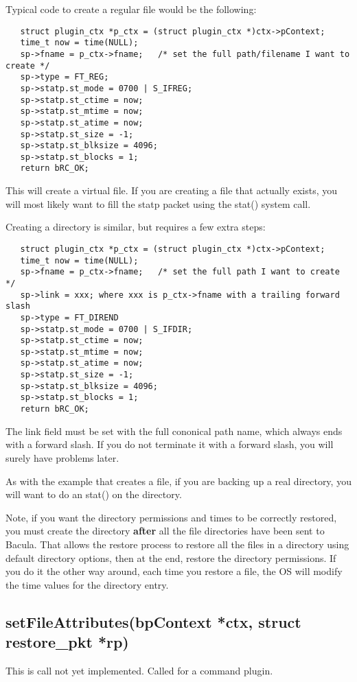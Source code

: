 Typical code to create a regular file would be the following:

\begin{verbatim}
   struct plugin_ctx *p_ctx = (struct plugin_ctx *)ctx->pContext;
   time_t now = time(NULL);
   sp->fname = p_ctx->fname;   /* set the full path/filename I want to create */
   sp->type = FT_REG;
   sp->statp.st_mode = 0700 | S_IFREG;
   sp->statp.st_ctime = now;
   sp->statp.st_mtime = now;
   sp->statp.st_atime = now;
   sp->statp.st_size = -1;
   sp->statp.st_blksize = 4096;
   sp->statp.st_blocks = 1;
   return bRC_OK;
\end{verbatim}

This will create a virtual file.  If you are creating a file that actually 
exists, you will most likely want to fill the statp packet using the
stat() system call.

Creating a directory is similar, but requires a few extra steps:

\begin{verbatim}
   struct plugin_ctx *p_ctx = (struct plugin_ctx *)ctx->pContext;
   time_t now = time(NULL);
   sp->fname = p_ctx->fname;   /* set the full path I want to create */
   sp->link = xxx; where xxx is p_ctx->fname with a trailing forward slash
   sp->type = FT_DIREND
   sp->statp.st_mode = 0700 | S_IFDIR;
   sp->statp.st_ctime = now;
   sp->statp.st_mtime = now;
   sp->statp.st_atime = now;
   sp->statp.st_size = -1;
   sp->statp.st_blksize = 4096;
   sp->statp.st_blocks = 1;
   return bRC_OK;
\end{verbatim}

The link field must be set with the full cononical path name, which always 
ends with a forward slash.  If you do not terminate it with a forward slash,
you will surely have problems later.

As with the example that creates a file, if you are backing up a real
directory, you will want to do an stat() on the directory.  

Note, if you want the directory permissions and times to be correctly
restored, you must create the directory {\bf after} all the file directories
have been sent to Bacula. That allows the restore process to restore all the
files in a directory using default directory options, then at the end, restore
the directory permissions.  If you do it the other way around, each time you
restore a file, the OS will modify the time values for the directory entry.

\subsection{setFileAttributes(bpContext *ctx, struct restore\_pkt *rp)}
This is call not yet implemented.  Called for a command plugin.

